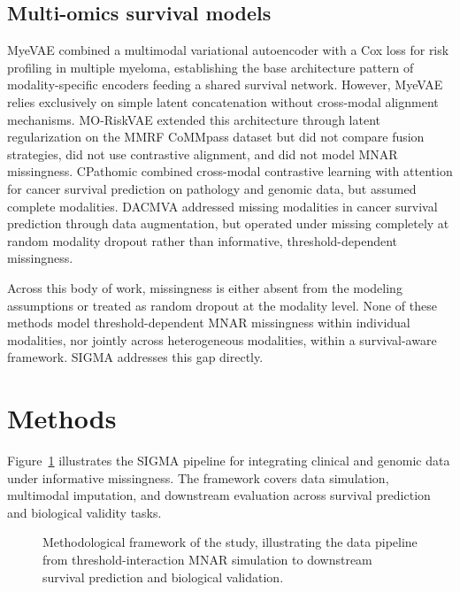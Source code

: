 \documentclass[final,3p,times,authoryear]{elsarticle}
\begin{document}
\subsection{Multi-omics survival models}
MyeVAE \citep{chang2025myevae} combined a multimodal variational autoencoder with a Cox loss for risk profiling in multiple myeloma, establishing the base architecture pattern of modality-specific encoders feeding a shared survival network. However, MyeVAE relies exclusively on simple latent concatenation without cross-modal alignment mechanisms. MO-RiskVAE \citep{chen2026moriskvae} extended this architecture through latent regularization on the MMRF CoMMpass dataset but did not compare fusion strategies, did not use contrastive alignment, and did not model MNAR missingness. CPathomic \citep{li2025cpathomic} combined cross-modal contrastive learning with attention for cancer survival prediction on pathology and genomic data, but assumed complete modalities. DACMVA \citep{rajaram2024dacmva} addressed missing modalities in cancer survival prediction through data augmentation, but operated under missing completely at random modality dropout rather than informative, threshold-dependent missingness.

Across this body of work, missingness is either absent from the modeling assumptions or treated as random dropout at the modality level. None of these methods model threshold-dependent MNAR missingness within individual modalities, nor jointly across heterogeneous modalities, within a survival-aware framework. SIGMA addresses this gap directly.

\section{Methods}
\label{sec:methods}

Figure~\ref{fig:framework} illustrates the SIGMA pipeline for integrating clinical and genomic data under informative missingness. The framework covers data simulation, multimodal imputation, and downstream evaluation across survival prediction and biological validity tasks.

\begin{figure}[!t]
\centering

\caption{Methodological framework of the study, illustrating the data pipeline from threshold-interaction MNAR simulation to downstream survival prediction and biological validation.}
\label{fig:framework}
\end{figure}
\end{document}
